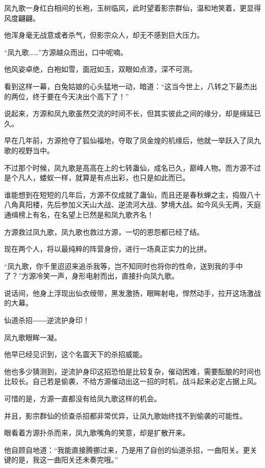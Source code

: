 
\begin{this_body}

凤九歌一身红白相间的长袍，玉树临风，此时望着影宗群仙，温和地笑着，更显得风度翩翩。

他浑身毫无战意或者杀气，但影宗众人，却无不感到巨大压力。

“凤九歌……”方源越众而出，口中呢喃。

他风姿卓绝，白袍如雪，面冠如玉，双眼如点漆，深不可测。

看到这样一幕，白兔姑娘的心头猛地一动，暗道：“这当今世上，八转之下最杰出的两位，终于要在今天决出个高下了！”

说起来，方源和凤九歌虽然交流的时间不长，但其实彼此之间的缘分，却是绵延已久。

早在几年前，方源抢夺了狐仙福地，夺取了凤金煌的机缘后，他就一举跃入了凤九歌的视野当中。

不过那个时候，凤九歌是高高在上的七转蛊仙，成名已久，巅峰人物。而方源不过是个凡人，蝼蚁一样，就算是有点出彩，也只是如此而已。

谁能想到在短短的几年后，方源不仅成就了蛊仙，而且还是春秋蝉之主，捣毁八十八角真阳楼，先后参加义天山大战、逆流河大战、梦境大战。如今风头无两，天庭通缉榜上有名，在名望上已然是和凤九歌齐名！

方源救过凤九歌，凤九歌也救过方源，一切的恩怨都已经了结。

现在两个人，将以最纯粹的阵营身份，进行一场真正实力的比拼。

“凤九歌，你千里迢迢来追杀我等，岂不知同时也将你的性命，送到我的手中了？”方源冷笑一声，身形电射而出，直接扑向凤九歌。

说话间，他身上浮现出仙衣绶带，黑发激扬，眼眸射电，悍然动手，拉开这场激战的大幕。

仙道杀招――逆流护身印！

凤九歌眼眸一凝。

他早已经见识到，这个名震天下的杀招威能。

他也多少猜测到，逆流护身印这招恐怕是比较复杂，催动困难，需要酝酿的时间也比较长。自己若是偷袭，不给方源催动出这一招的时机，战斗起来必定占据上风。

可惜的是，方源一直都没有给凤九歌这样的机会。

并且，影宗群仙的侦查杀招都非常优异，让凤九歌始终找不到偷袭的可能性。

眼看着方源扑杀而来，凤九歌嘴角的笑意，却是扩散开来。

他自顾自地道：“我能直接腾挪过来，乃是用了自创的仙道杀招，一曲阳关。更关键的是，我这一曲阳关还未奏完哦。”


\end{this_body}
